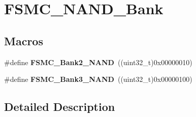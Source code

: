 \hypertarget{group___f_s_m_c___n_a_n_d___bank}{}\section{F\+S\+M\+C\+\_\+\+N\+A\+N\+D\+\_\+\+Bank}
\label{group___f_s_m_c___n_a_n_d___bank}
\subsection*{Macros}
\begin{DoxyCompactItemize}
\item 
\hypertarget{group___f_s_m_c___n_a_n_d___bank_ga294e7134aa329a09e56b61eec9882a27}{}\#define {\bfseries F\+S\+M\+C\+\_\+\+Bank2\+\_\+\+N\+A\+N\+D}~((uint32\+\_\+t)0x00000010)\label{group___f_s_m_c___n_a_n_d___bank_ga294e7134aa329a09e56b61eec9882a27}

\item 
\hypertarget{group___f_s_m_c___n_a_n_d___bank_gaf72def0732c026b0245d721ee371c85b}{}\#define {\bfseries F\+S\+M\+C\+\_\+\+Bank3\+\_\+\+N\+A\+N\+D}~((uint32\+\_\+t)0x00000100)\label{group___f_s_m_c___n_a_n_d___bank_gaf72def0732c026b0245d721ee371c85b}

\end{DoxyCompactItemize}


\subsection{Detailed Description}

